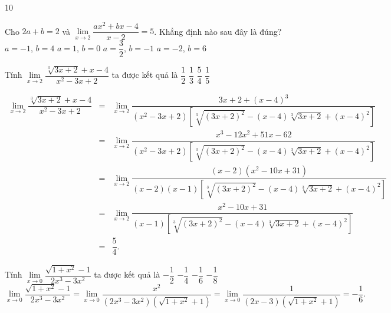 \begin{indapan}{10}
\begin{ex}%
	Cho $ 2a+b=2 $ và $ \lim\limits_{x \to 2} \dfrac{ax^2+bx-4}{x-2}=5$. Khẳng định nào sau đây là đúng?
	\choice
	{$a=-1$, $b=4$}
	{$a=1$, $b=0$}
	{\True $a=\dfrac{3}{2}$, $b=-1$}
	{$a=-2$, $b=6$}
\end{ex}

\begin{ex}%
	Tính $\lim\limits_{x \to 2}\dfrac{\sqrt[3]{3x+2} + x - 4}{x^2 - 3x + 2}$ ta được kết quả là
	\choice
	{$\dfrac{1}{2}$}
	{$\dfrac{1}{3}$}
	{\True $\dfrac{5}{4}$}
	{$\dfrac{1}{5}$}
	\loigiai
	{
		\allowdisplaybreaks
		\begin{eqnarray*}
			\lim\limits_{x \to 2}\dfrac{\sqrt[3]{3x+2} + x - 4}{x^2 - 3x + 2} &=& \lim\limits_{x \to 2}\dfrac{3x + 2 + (x-4)^3}{(x^2 - 3x + 2)\left[\sqrt[3]{(3x+2)^2} - (x-4)\sqrt[3]{3x+2} + (x-4)^2\right]}\\
			&=& \lim\limits_{x \to 2}\dfrac{x^3 - 12x^2 + 51x - 62}{(x^2 - 3x + 2)\left[\sqrt[3]{(3x+2)^2} - (x-4)\sqrt[3]{3x+2} + (x-4)^2\right]}\\
			&=& \lim\limits_{x \to 2}\dfrac{(x-2)(x^2 - 10x + 31)}{(x-2)(x-1)\left[\sqrt[3]{(3x+2)^2} - (x-4)\sqrt[3]{3x+2} + (x-4)^2\right]}\\
			&=& \lim\limits_{x \to 2}\dfrac{x^2 - 10x + 31}{(x-1)\left[\sqrt[3]{(3x+2)^2} - (x-4)\sqrt[3]{3x+2} + (x-4)^2\right]}\\
			&=& \dfrac{5}{4}.
		\end{eqnarray*}
		
	}
\end{ex}	

\begin{ex}%
	Tính $\lim\limits_{x \to 0}\dfrac{\sqrt{1+x^2} - 1}{2x^3 - 3x^2}$ ta được kết quả là
	\choice
	{$-\dfrac{1}{2}$}
	{$-\dfrac{1}{4}$}
	{\True $-\dfrac{1}{6}$}
	{$-\dfrac{1}{8}$}
	\loigiai
	{
		$$\lim\limits_{x \to 0}\dfrac{\sqrt{1+x^2} - 1}{2x^3 - 3x^2} = \lim\limits_{x \to 0}\dfrac{x^2}{(2x^3 - 3x^2) \left(\sqrt{1+x^2} + 1\right)} = \lim\limits_{x \to 0}\dfrac{1}{(2x - 3) \left(\sqrt{1+x^2} + 1\right)} = -\dfrac{1}{6}.$$
	}
\end{ex}


\end{indapan}
